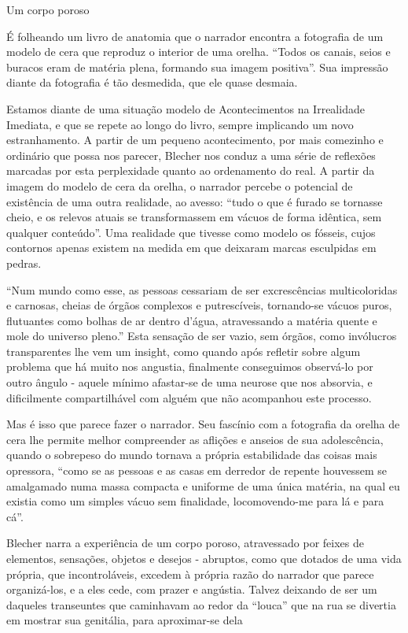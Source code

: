 Um corpo poroso

É folheando um livro de anatomia que o narrador encontra a fotografia de um modelo de cera que reproduz o interior de uma orelha. “Todos os canais, seios e buracos eram de matéria plena, formando sua imagem positiva”. Sua impressão diante da fotografia é tão desmedida, que ele quase desmaia.

Estamos diante de uma situação modelo de Acontecimentos na Irrealidade Imediata, e que se repete ao longo do livro, sempre implicando um novo estranhamento. A partir de um pequeno acontecimento, por mais comezinho e ordinário que possa nos parecer, Blecher nos conduz a uma série de reflexões marcadas por esta perplexidade quanto ao ordenamento do real. A partir da imagem do modelo de cera da orelha, o narrador percebe o potencial de existência de uma outra realidade, ao avesso: “tudo o que é furado se tornasse cheio, e os relevos atuais se transformassem em vácuos de forma idêntica, sem qualquer conteúdo”. Uma realidade que tivesse como modelo os fósseis, cujos contornos apenas existem na medida em que deixaram marcas esculpidas em pedras.

“Num mundo como esse, as pessoas cessariam de ser excrescências multicoloridas e carnosas, cheias de órgãos complexos e putrescíveis, tornando-se vácuos puros, flutuantes como bolhas de ar dentro d’água, atravessando a matéria quente e mole do universo pleno.” Esta sensação de ser vazio, sem órgãos, como invólucros transparentes lhe vem um insight, como quando após refletir sobre algum problema que há muito nos angustia, finalmente conseguimos observá-lo por outro ângulo - aquele mínimo afastar-se de uma neurose que nos absorvia, e dificilmente compartilhável com alguém que não acompanhou este processo.

Mas é isso que parece fazer o narrador. Seu fascínio com a fotografia da orelha de cera lhe permite melhor compreender as aflições e anseios de sua adolescência, quando o sobrepeso do mundo tornava a própria estabilidade das coisas mais opressora, “como se as pessoas e as casas em derredor de repente houvessem se amalgamado numa massa compacta e uniforme de uma única matéria, na qual eu existia como um simples vácuo sem finalidade, locomovendo-me para lá e para cá”.

Blecher narra a experiência de um corpo poroso, atravessado por feixes de elementos, sensações, objetos e desejos - abruptos, como que dotados de uma vida própria, que incontroláveis, excedem à própria razão do narrador que parece organizá-los, e a eles cede, com prazer e angústia. Talvez deixando de ser um daqueles transeuntes que caminhavam ao redor da “louca” que na rua se divertia em mostrar sua genitália, para aproximar-se dela

